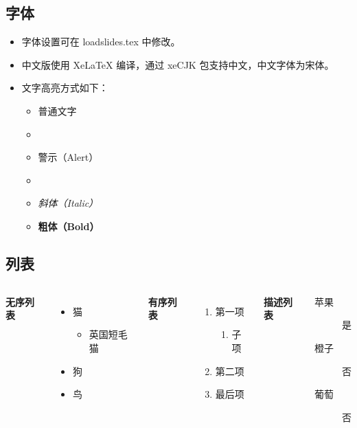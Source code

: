 \documentclass[
11pt,notheorems,hyperref={pdfauthor=whatever},aspectratio=169
]{beamer}
\begin{document}
\subsection{字体}
\begin{frame}[fragile]
\begin{itemize}
    \item 字体设置可在 loadslides.tex 中修改。
    \item 中文版使用 XeLaTeX 编译，通过 xeCJK 包支持中文，中文字体为宋体。
    \item 文字高亮方式如下：
    \begin{itemize}
        \item 普通文字
        \item {}
        \item \alert{警示（Alert）}
        \item {}
        \item \textit{斜体（Italic）}
        \item \textbf{粗体（Bold）}
    \end{itemize}
\end{itemize}
\end{frame}

\subsection{列表}
\begin{frame}
    \begin{columns}[T,onlytextwidth]
      \textbf{无序列表}
      \begin{itemize}
        \item 猫
        \begin{itemize}
            \item 英国短毛猫
        \end{itemize}
        \item 狗 \item 鸟
      \end{itemize}

      \textbf{有序列表}
      \begin{enumerate}
        \item 第一项
        \begin{enumerate}
            \item 子项
        \end{enumerate}
        \item 第二项 \item 最后项
      \end{enumerate}

      \textbf{描述列表}
      \begin{description}
        \item[苹果] 是 \item[橙子] 否 \item[葡萄] 否
      \end{description}
\end{columns}
\end{frame}
\end{document}
